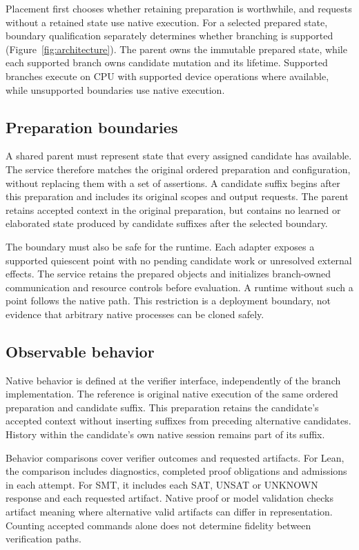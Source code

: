 \documentclass[10pt,twocolumn]{article}
\begin{document}
Placement first chooses whether retaining preparation is worthwhile, and requests without a retained state use native execution. For a selected prepared state, boundary qualification separately determines whether branching is supported (Figure~\ref{fig:architecture}). The parent owns the immutable prepared state, while each supported branch owns candidate mutation and its lifetime. Supported branches execute on CPU with supported device operations where available, while unsupported boundaries use native execution.

\subsection{Preparation boundaries}\label{sec:preparation}
A shared parent must represent state that every assigned candidate has available. The service therefore matches the original ordered preparation and configuration, without replacing them with a set of assertions. A candidate suffix begins after this preparation and includes its original scopes and output requests. The parent retains accepted context in the original preparation, but contains no learned or elaborated state produced by candidate suffixes after the selected boundary.

The boundary must also be safe for the runtime. Each adapter exposes a supported quiescent point with no pending candidate work or unresolved external effects. The service retains the prepared objects and initializes branch-owned communication and resource controls before evaluation. A runtime without such a point follows the native path. This restriction is a deployment boundary, not evidence that arbitrary native processes can be cloned safely.

\subsection{Observable behavior}\label{sec:behavior}
Native behavior is defined at the verifier interface, independently of the branch implementation. The reference is original native execution of the same ordered preparation and candidate suffix. This preparation retains the candidate's accepted context without inserting suffixes from preceding alternative candidates. History within the candidate's own native session remains part of its suffix.

Behavior comparisons cover verifier outcomes and requested artifacts. For Lean, the comparison includes diagnostics, completed proof obligations and admissions in each attempt. For SMT, it includes each SAT, UNSAT or UNKNOWN response and each requested artifact. Native proof or model validation checks artifact meaning where alternative valid artifacts can differ in representation. Counting accepted commands alone does not determine fidelity between verification paths.
\end{document}
